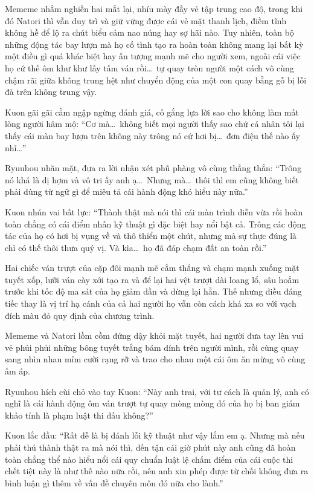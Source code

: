 \documentclass[../main.tex]{subfiles}
\begin{document}
Mememe nhắm nghiền hai mắt lại, nhíu mày đầy vẻ tập trung cao độ, trong khi đó Natori thì vẫn duy trì và giữ vững được cái vẻ mặt thanh lịch, điềm tĩnh không hề để lộ ra chút biểu cảm nao núng hay sợ hãi nào. Tuy nhiên, toàn bộ những động tác bay lượn mà họ cố tình tạo ra hoàn toàn không mang lại bất kỳ một điều gì quá khác biệt hay ấn tượng mạnh mẽ cho người xem, ngoài cái việc họ cứ thế ôm khư khư lấy tấm ván rồi\dots\ tự quay tròn người một cách vô cùng chậm rãi giữa không trung hệt như chuyển động của một con quay bằng gỗ bị lỗi đà trên không trung vậy.

Kuon gãi gãi cằm ngập ngừng đánh giá, cố gắng lựa lời sao cho không làm mất lòng người hâm mộ: ``Cơ mà\dots\ không biết mọi người thấy sao chứ cá nhân tôi lại thấy cái màn bay lượn trên không này trông nó cứ hơi bị\dots\ đơn điệu thế nào ấy nhỉ\dots''

Ryuuhou nhăn mặt, đưa ra lời nhận xét phũ phàng vô cùng thẳng thắn: ``Trông nó khá là dị hợm và vô tri ấy anh ạ\dots\ Nhưng mà\dots\ thôi thì em cũng không biết phải dùng từ ngữ gì để miêu tả cái hành động khó hiểu này nữa.''

Kuon nhún vai bất lực: ``Thành thật mà nói thì cái màn trình diễn vừa rồi hoàn toàn chẳng có cái điểm nhấn kỹ thuật gì đặc biệt hay nổi bật cả. Trông các động tác của họ có hơi bị vụng về và thô thiển một chút, nhưng mà sự thực đúng là chỉ có thế thôi thưa quý vị. Và kìa\dots\ họ đã đáp chạm đất an toàn rồi.''

Hai chiếc ván trượt của cặp đôi mạnh mẽ cắm thẳng và chạm mạnh xuống mặt tuyết xốp, lưỡi ván cày xới tạo ra và để lại hai vệt trượt dài loang lổ, sâu hoắm trước khi tốc độ ma sát của họ giảm dần và dừng lại hẳn. Thế nhưng điều đáng tiếc thay là vị trí hạ cánh của cả hai người họ vẫn còn cách khá xa so với vạch đích màu đỏ quy định của chương trình.

Mememe và Natori lồm cồm đứng dậy khỏi mặt tuyết, hai người đưa tay lên vui vẻ phủi phủi những bông tuyết trắng bám dính trên người mình, rồi cùng quay sang nhìn nhau mỉm cười rạng rỡ và trao cho nhau một cái ôm ăn mừng vô cùng ấm áp.

Ryuuhou hích cùi chỏ vào tay Kuon: ``Này anh trai, với tư cách là quản lý, anh có nghĩ là cái hành động ôm ván trượt tự quay mòng mòng đó của họ bị ban giám khảo tính là phạm luật thi đấu không?''

Kuon lắc đầu: ``Rất dễ là bị đánh lỗi kỹ thuật như vậy lắm em ạ. Nhưng mà nếu phải thú thành thật ra mà nói thì, đến tận cái giờ phút này anh cũng đã hoàn toàn chẳng thể nào hiểu nổi cái quy chuẩn luật lệ chấm điểm của cái cuộc thi chết tiệt này là như thế nào nữa rồi, nên anh xin phép được từ chối không đưa ra bình luận gì thêm về vấn đề chuyên môn đó nữa cho lành.''
\end{document}
